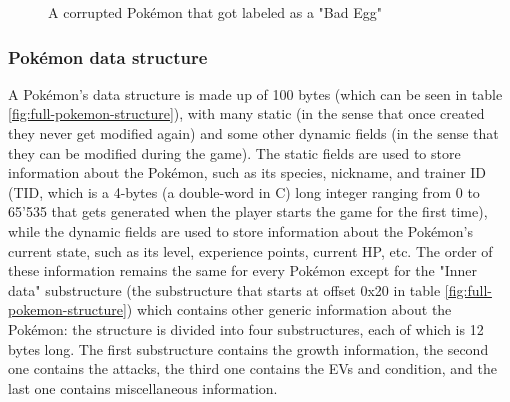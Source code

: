 \documentclass[a4paper]{usiinfbachelorproject}
\begin{document}
\begin{figure}[h!]
	\caption{A corrupted Pokémon that got labeled as a "Bad Egg"}\label{fig:bad_egg}
\end{figure}

\subsubsection{Pokémon data structure}
\label{sec:data_structure}
A Pokémon's data structure is made up of 100 bytes (which can be seen in table \ref{fig:full-pokemon-structure}), with many static (in the sense that once created they never get modified again) and some other dynamic fields (in the sense that they can be modified during the game). The static fields are used to store information about the Pokémon, such as its species, nickname, and trainer ID (TID, which is a 4-bytes (a double-word in C) long integer ranging from 0 to 65'535 that gets generated when the player starts the game for the first time), while the dynamic fields are used to store information about the Pokémon's current state, such as its level, experience points, current HP, etc.
The order of these information remains the same for every Pokémon except for the "Inner data" substructure (the substructure that starts at offset 0x20 in table \ref{fig:full-pokemon-structure}) which contains other generic information about the Pokémon: the structure is divided into four substructures, each of which is 12 bytes long. The first substructure contains the growth information, the second one contains the attacks, the third one contains the EVs and condition, and the last one contains miscellaneous information.
\end{document}
